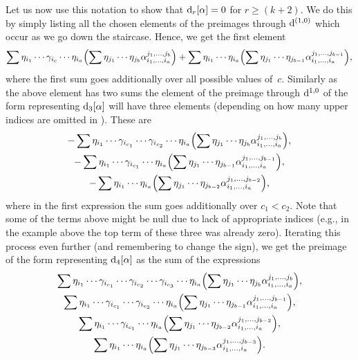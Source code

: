 \documentclass[pdftex]{sigma}
\numberwithin{equation}{section}
\theoremstyle{definition}
\begin{document}
Let us now use this notation to show that ${\rm d}_r[\alpha]=0$ for $r\geq (k+2)$. We do this by simply listing all the chosen elements of the preimages through ${\rm d}^{(1,0)}$ which occur as we go down the staircase. Hence, we get the first element
\[\sum \eta_{i_1}\cdots \gamma_{i_c}\cdots \eta_{i_a}\Bigl(\sum \eta_{j_1}\cdots \eta_{j_b}\alpha_{i_1,\dots,i_a}^{j_1,\dots,j_b}\Bigr)+\sum\eta_{i_1}\cdots \eta_{i_a}\Bigl(\sum \eta_{j_1}\cdots \eta_{j_{b-1}}\alpha_{i_1,\dots,i_a}^{j_1,\dots,j_{b-1}}\Bigr),\]
where the first sum goes additionally over all possible values of~$c$. Similarly as the above element has two sums the element of the preimage through ${\rm d}^{1,0}$ of the form representing ${\rm d}_3[\alpha]$ will have three elements (depending
on how many upper indices are omitted in ). These are
\begin{gather*}
-\sum \eta_{i_1}\cdots \gamma_{i_{c_1}}\cdots \gamma_{i_{c_2}}\cdots \eta_{i_a}\Bigl(\sum \eta_{j_1}\cdots \eta_{j_b}\alpha_{i_1,\dots,i_a}^{j_1,\dots,j_b}\Bigr),\\
-\sum \eta_{i_1}\cdots \gamma_{i_{c_1}}\cdots \eta_{i_a}\Bigl(\sum \eta_{j_1}\cdots \eta_{j_{b-1}}\alpha_{i_1,\dots,i_a}^{j_1,\dots,j_{b-1}}\Bigr),\\
-\sum \eta_{i_1}\cdots \eta_{i_a}\Bigl(\sum \eta_{j_1}\cdots \eta_{j_{b-2}}\alpha_{i_1,\dots,i_a}^{j_1,\dots,j_{b-2}}\Bigr),
\end{gather*}
where in the first expression the sum goes additionally over $c_1<c_2$. Note that some of the terms above might be null due to lack of appropriate indices (e.g., in the example above the top term of these three was already zero). Iterating this process even further (and remembering to change the sign), we get the preimage of the form representing ${\rm d}_4[\alpha]$ as the sum of the expressions
\begin{gather*}
\sum \eta_{i_1}\cdots \gamma_{i_{c_1}}\cdots \gamma_{i_{c_2}}\cdots \gamma_{i_{c_3}}\cdots \eta_{i_a}\Bigl(\sum \eta_{j_1}\cdots \eta_{j_b}\alpha_{i_1,\dots,i_a}^{j_1,\dots,j_b}\Bigr),\\
\sum \eta_{i_1}\cdots \gamma_{i_{c_1}}\cdots \gamma_{i_{c_2}}\cdots \eta_{i_a}\Bigl(\sum \eta_{j_1}\cdots \eta_{j_{b-1}}\alpha_{i_1,\dots,i_a}^{j_1,\dots,j_{b-1}}\Bigr),\\
\sum \eta_{i_1}\cdots \gamma_{i_{c_1}}\cdots \eta_{i_a}\Bigl(\sum \eta_{j_1}\cdots \eta_{j_{b-2}}\alpha_{i_1,\dots,i_a}^{j_1,\dots,j_{b-2}}\Bigr),\\
\sum \eta_{i_1}\cdots \eta_{i_a}\Bigl(\sum \eta_{j_1}\cdots \eta_{j_{b-3}}\alpha_{i_1,\dots,i_a}^{j_1,\dots,j_{b-3}}\Bigr).
\end{gather*}
\end{document}
